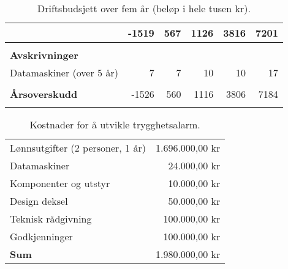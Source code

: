 \begin{table}
\begin{tabular}{lrrrrr}
                                    & -1519 &  567 & 1126 &  3816 &  7201 \\
    \hline
    \\
    \textbf{Avskrivninger} \\
    Datamaskiner (over 5 år)        &     7 &    7 &   10 &    10 &    17 \\
    \\
    \textbf{Årsoverskudd}           & -1526 &  560 & 1116 &  3806 &  7184 \\
    \thickhline
    \\
  \end{tabular}
  \caption{Driftsbudsjett over fem år (beløp i hele tusen kr).}
  \label{table.driftsbudsjett}
\end{table}


\begin{table}
  \centering
  \begin{tabular}{lr}
    Lønnsutgifter (2 personer, 1 år) &  1.696.000,00 kr \\
    Datamaskiner                     &     24.000,00 kr \\
    Komponenter og utstyr            &     10.000,00 kr \\
    Design deksel                    &     50.000,00 kr \\
    Teknisk rådgivning               &    100.000,00 kr \\
    Godkjenninger                    &    100.000,00 kr \\
    \textbf{Sum}                     &  1.980.000,00 kr \\
  \end{tabular}
  \caption{Kostnader for å utvikle trygghetsalarm.}
  \label{table.kostnad.alarm}
\end{table}

